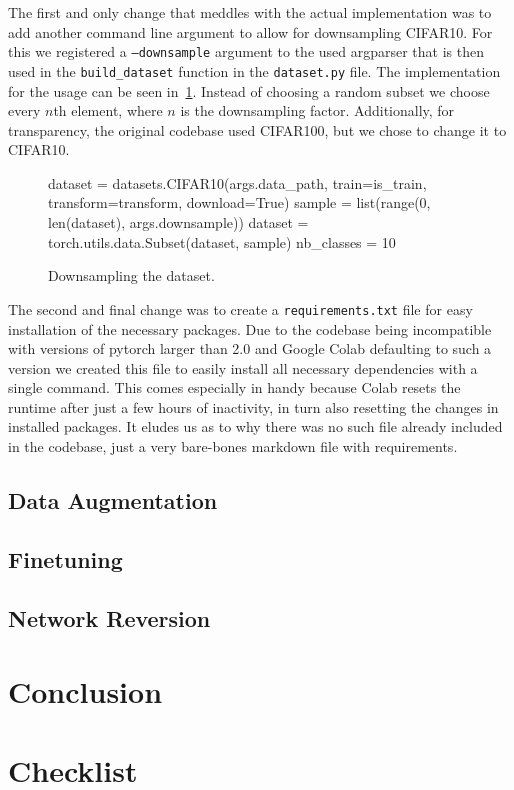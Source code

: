 \documentclass{article}
\begin{document}
    The first and only change that meddles with the actual implementation was to add another command line argument to allow for downsampling CIFAR10.
    For this we registered a \texttt{--downsample} argument to the used argparser that is then used in the \verb|build_dataset| function in the \texttt{dataset.py} file.
    The implementation for the usage can be seen in~\ref{fig:downsampling}.
    Instead of choosing a random subset we choose every $n$th element, where $n$ is the downsampling factor.
    Additionally, for transparency, the original codebase used CIFAR100, but we chose to change it to CIFAR10.
    \begin{figure}[h]
        \begin{python}
            dataset = datasets.CIFAR10(args.data_path, train=is_train,
            transform=transform, download=True)
            sample = list(range(0, len(dataset), args.downsample))
            dataset = torch.utils.data.Subset(dataset, sample)
            nb_classes = 10
        \end{python}
        \caption{Downsampling the dataset.}
        \label{fig:downsampling}


    \end{figure}

    The second and final change was to create a \texttt{requirements.txt} file for easy installation of the necessary packages.
    Due to the codebase being incompatible with versions of pytorch larger than 2.0 and Google Colab defaulting to such a version we created this file to easily install all necessary dependencies with a single command.
    This comes especially in handy because Colab resets the runtime after just a few hours of inactivity, in turn also resetting the changes in installed packages.
    It eludes us as to why there was no such file already included in the codebase, just a very bare-bones markdown file with requirements.

    \subsection{Data Augmentation}\label{subsec:data-augmentation}

    \subsection{Finetuning}\label{subsec:finetuning}

    \subsection{Network Reversion}\label{subsec:network-reversion}


    \section{Conclusion}\label{sec:conclusion}

    \printbibliography
    \section*{Checklist}
    
\end{document}
